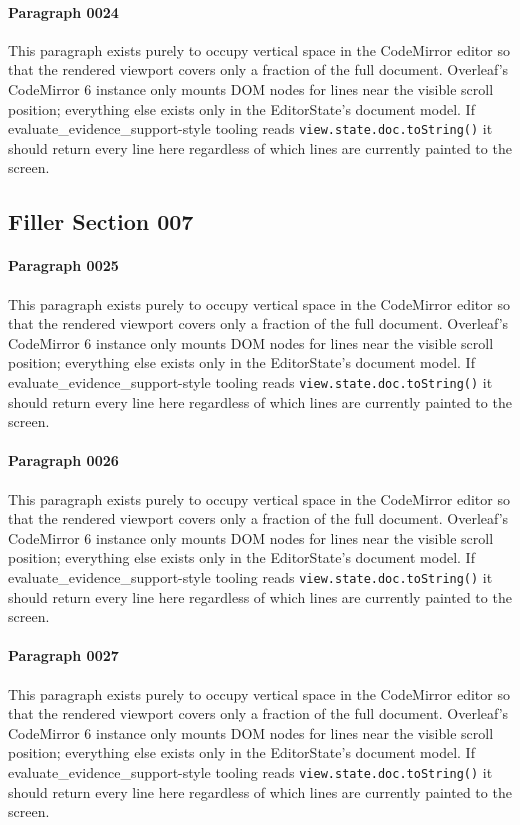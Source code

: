 \documentclass{article}
\begin{document}
\paragraph{Paragraph 0024}
This paragraph exists purely to occupy vertical space in the CodeMirror editor so that the rendered viewport covers only a fraction of the full document. Overleaf's CodeMirror 6 instance only mounts DOM nodes for lines near the visible scroll position; everything else exists only in the EditorState's document model. If evaluate\_evidence\_support-style tooling reads \texttt{view.state.doc.toString()} it should return every line here regardless of which lines are currently painted to the screen.

\subsection{Filler Section 007}
\paragraph{Paragraph 0025}
This paragraph exists purely to occupy vertical space in the CodeMirror editor so that the rendered viewport covers only a fraction of the full document. Overleaf's CodeMirror 6 instance only mounts DOM nodes for lines near the visible scroll position; everything else exists only in the EditorState's document model. If evaluate\_evidence\_support-style tooling reads \texttt{view.state.doc.toString()} it should return every line here regardless of which lines are currently painted to the screen.

\paragraph{Paragraph 0026}
This paragraph exists purely to occupy vertical space in the CodeMirror editor so that the rendered viewport covers only a fraction of the full document. Overleaf's CodeMirror 6 instance only mounts DOM nodes for lines near the visible scroll position; everything else exists only in the EditorState's document model. If evaluate\_evidence\_support-style tooling reads \texttt{view.state.doc.toString()} it should return every line here regardless of which lines are currently painted to the screen.

\paragraph{Paragraph 0027}
This paragraph exists purely to occupy vertical space in the CodeMirror editor so that the rendered viewport covers only a fraction of the full document. Overleaf's CodeMirror 6 instance only mounts DOM nodes for lines near the visible scroll position; everything else exists only in the EditorState's document model. If evaluate\_evidence\_support-style tooling reads \texttt{view.state.doc.toString()} it should return every line here regardless of which lines are currently painted to the screen.
\end{document}
